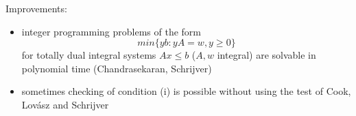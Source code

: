 \documentclass{beamer}
\begin{document}
\begin{frame}

	\begin{block}

		Improvements:

		\begin{itemize}

			\item integer programming problems of the form \begin{equation*} min \{yb: yA=w, y\geq 0 \}\end{equation*} for totally dual integral systems $Ax \leq b$ ($A, w$ integral) are solvable in polynomial time (Chandrasekaran, Schrijver)

			\item sometimes checking of condition (i) is possible without using the test of Cook, Lovász and Schrijver

		\end{itemize}

	\end{block}

\end{frame}
\end{document}

